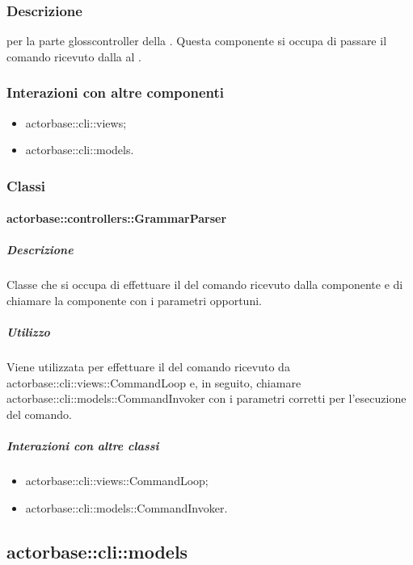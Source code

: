 \documentclass{scalatekids-article}
\begin{document}
\subsubsection{Descrizione}

 per la parte gloss{controller} della . Questa
componente si occupa di passare il comando ricevuto dalla  al
.

\subsubsection{Interazioni con altre componenti}

\begin{itemize}
\item actorbase::cli::views;
\item actorbase::cli::models.
\end{itemize}

\subsubsection{Classi}

\paragraph{actorbase::controllers::GrammarParser}

\subparagraph{Descrizione}

Classe che si occupa di effettuare il  del comando ricevuto
dalla componente  e di chiamare la componente  con i
parametri opportuni.

\subparagraph{Utilizzo}

Viene utilizzata per effettuare il  del comando ricevuto da
actorbase::cli::views::CommandLoop e, in seguito, chiamare
actorbase::cli::models::CommandInvoker con i parametri corretti per
l'esecuzione del comando.

\subparagraph{Interazioni con altre classi}

\begin{itemize}
\item actorbase::cli::views::CommandLoop;
\item actorbase::cli::models::CommandInvoker.
\end{itemize}

\subsection{actorbase::cli::models}
\end{document}

